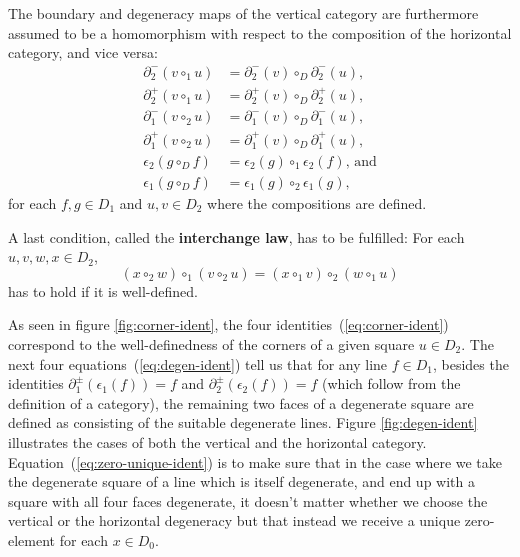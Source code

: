 \begin{defn}
The boundary and degeneracy maps of the vertical category are
furthermore assumed to be a homomorphism with respect to
the composition of the horizontal category, and vice versa:
\begin{equation} \label{eq:linear-ident}
\begin{aligned}
\partial^-_2(v \circ_1 u) &= \partial^-_2(v) \circ_D \partial^-_2(u)\text{,} \\
\partial^+_2(v \circ_1 u) &= \partial^+_2(v) \circ_D \partial^+_2(u)\text{,} \\
\partial^-_1(v \circ_2 u) &= \partial^-_1(v) \circ_D \partial^-_1(u)\text{,} \\
\partial^+_1(v \circ_2 u) &= \partial^+_1(v) \circ_D \partial^+_1(u)\text{,} \\
\epsilon_2(g \circ_D f) &= \epsilon_2(g) \circ_1 \epsilon_2(f)\text{, and} \\
\epsilon_1(g \circ_D f) &= \epsilon_1(g) \circ_2 \epsilon_1(g)\text{,}
\end{aligned}
\end{equation}
for each $f, g \in D_1$ and $u, v \in D_2$ where the compositions are defined.

A last condition, called the \textbf{interchange law}, has to be fulfilled:
For each $u, v, w, x \in D_2$,
\begin{equation} \label{eq:interchange}
(x \circ_2 w) \circ_1 (v \circ_2 u) = (x \circ_1 v) \circ_2 (w \circ_1 u)
\end{equation}
has to hold if it is well-defined.
\end{defn}

As seen in figure \ref{fig:corner-ident}, the four identities~(\ref{eq:corner-ident})
correspond to the well-definedness of the corners of a given square $u \in D_2$.
The next four equations~(\ref{eq:degen-ident}) tell us that for any line $f \in D_1$,
besides the identities
$\partial^\pm_1(\epsilon_1(f)) = f$ and
$\partial^\pm_2(\epsilon_2(f)) = f$ (which follow from the definition of a
category), the remaining two faces of a degenerate square are defined as
consisting of the suitable degenerate lines. Figure \ref{fig:degen-ident}
illustrates the cases of both the vertical and the horizontal category.
Equation~(\ref{eq:zero-unique-ident}) is to make sure that in the case where we take the degenerate
square of a line which is itself degenerate, and end up with a square with all four
faces degenerate, it doesn't matter whether we choose the vertical or the horizontal
degeneracy but that instead we receive a unique zero-element for each $x \in D_0$.

